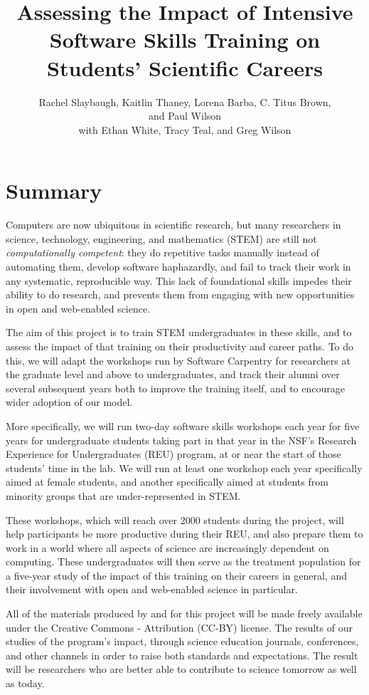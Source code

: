 \documentclass[11pt]{article}
\title{
  Assessing the Impact of Intensive Software Skills Training
  on Students' Scientific Careers
}
\author{
  Rachel Slaybaugh, Kaitlin Thaney, Lorena Barba, C. Titus Brown,\\   
  and Paul Wilson\\ 
  with Ethan White, Tracy Teal, and Greg Wilson
}
\begin{document}
\maketitle
\pagebreak

\section{Summary}

Computers are now ubiquitous in scientific research, but many
researchers in science, technology, engineering, and mathematics
(STEM) are still not \emph{computationally competent}: they do
repetitive tasks manually instead of automating them, develop software
haphazardly, and fail to track their work in any systematic,
reproducible way.  This lack of foundational skills impedes their
ability to do research, and prevents them from engaging with new
opportunities in open and web-enabled science.

The aim of this project is to train STEM undergraduates in these
skills, and to assess the impact of that training on their
productivity and career paths.  To do this, we will adapt the
workshops run by Software Carpentry for researchers at the graduate
level and above to undergraduates, and track their alumni over several
subsequent years both to improve the training itself, and to encourage
wider adoption of our model.

More specifically, we will run two-day software skills workshops each
year for five years for undergraduate students taking part in that
year in the NSF's Research Experience for Undergraduates (REU)
program, at or near the start of those students' time in the lab.  We
will run at least one workshop each year specifically aimed at female
students, and another specifically aimed at students from minority
groups that are under-represented in STEM.

These workshops, which will reach over 2000 students during the
project, will help participants be more productive during their REU,
and also prepare them to work in a world where all aspects of science
are increasingly dependent on computing.  These undergraduates will
then serve as the treatment population for a five-year study of the
impact of this training on their careers in general, and their
involvement with open and web-enabled science in particular.

All of the materials produced by and for this project will be made
freely available under the Creative Commons - Attribution (CC-BY)
license.  The results of our studies of the program's impact, through
science education journals, conferences, and other channels in order
to raise both standards and expectations.  The result will be
researchers who are better able to contribute to science tomorrow as
well as today.
\end{document}
